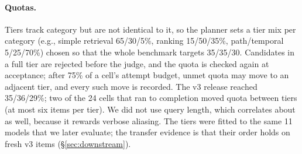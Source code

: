 \paragraph{Quotas.} Tiers track category but are not identical to it, so the planner sets a tier mix per category (e.g., simple retrieval 65/30/5\%, ranking 15/50/35\%, path/temporal 5/25/70\%) chosen so that the whole benchmark targets 35/35/30. Candidates in a full tier are rejected before the judge, and the quota is checked again at acceptance; after 75\% of a cell's attempt budget, unmet quota may move to an adjacent tier, and every such move is recorded. The v3 release reached 35/36/29\%; two of the 24 cells that ran to completion moved quota between tiers (at most six items per tier). We did not use query length, which correlates about as well, because it rewards verbose aliasing. The tiers were fitted to the same 11 models that we later evaluate; the transfer evidence is that their order holds on fresh v3 items (\S\ref{sec:downstream}).
